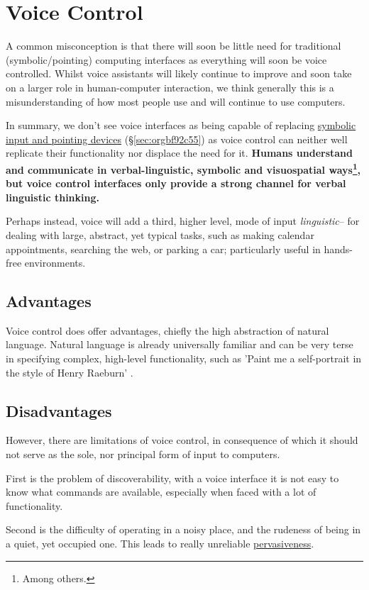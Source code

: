 \documentclass[logo,bsc,singlespacing,parskip]{infthesis}
\begin{document}
\section{Voice Control}
\label{sec:orgc04888c}
A common misconception is that there will soon be little need for traditional (symbolic/pointing) computing interfaces as everything will soon be voice controlled.
Whilst voice assistants will likely continue to improve and soon take on a larger role in human-computer interaction, we think generally this is a misunderstanding of how most people use and will continue to use computers.

In summary, we don't see voice interfaces as being capable of replacing \hyperref[sec:orgbf92c55]{symbolic input and pointing devices} (\S \ref{sec:orgbf92c55}) as voice control can neither well replicate their functionality nor displace the need for it.
\textbf{Humans understand and communicate in verbal-linguistic, symbolic and visuospatial ways\footnote{Among others.}, but voice control interfaces only provide a strong channel for verbal linguistic thinking.}

Perhaps instead, voice will add a third, higher level, mode of input \emph{linguistic}-- for dealing with large, abstract, yet typical tasks, such as making calendar appointments, searching the web, or parking a car; particularly useful in hands-free environments.

\subsection{Advantages}
\label{sec:orgb36c0e3}
Voice control does offer advantages, chiefly the high abstraction of natural language.
Natural language is already universally familiar and can be very terse in specifying complex, high-level functionality, such as 'Paint me a self-portrait in the style of Henry Raeburn' \autocite{DALLa}.

\subsection{Disadvantages}
\label{sec:org1fbb034}
However, there are limitations of voice control, in consequence of which it should not serve as the sole, nor principal form of input to computers.

First is the problem of discoverability, with a voice interface it is not easy to know what commands are available, especially when faced with a lot of functionality.

Second is the difficulty of operating in a noisy place, and the rudeness of being in a quiet, yet occupied one.
This leads to really unreliable \hyperref[pervasiveness]{pervasiveness}.
\end{document}
